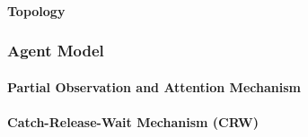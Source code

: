 \documentclass{article}
\begin{document}
                \paragraph{Topology}



	        \subsubsection{Agent Model}

                \paragraph{Partial Observation and Attention Mechanism}


                \paragraph{Catch-Release-Wait Mechanism (CRW)}
\end{document}
